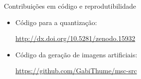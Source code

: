 \documentclass[10pt]{beamer}
\begin{document}
\begin{frame}{Contribuições em código e reprodutibilidade}
  \setlength\leftmargini{1em}
    \begin{itemize}
    \item Código para a quantização:
    \begin{center}
      \small{\url{http://dx.doi.org/10.5281/zenodo.15932}}
    \end{center}
    \item Código da geração de imagens artificiais:
    \begin{center}
      \small{\url{https://github.com/GabiThume/msc-src}}
    \end{center}
  \end{itemize}
\end{frame}
\end{document}
